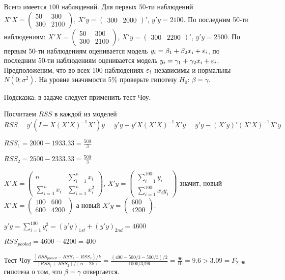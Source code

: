 \begin{problem}
Всего имеется $100$ наблюдений. Для первых 50-ти наблюдений $X'X=\begin{pmatrix}
50 & 300 \\
300 & 2100
\end{pmatrix}$, $X'y=\begin{pmatrix}
300 & 2000
\end{pmatrix}'$, $y'y=2100$. По последним 50-ти наблюдениям: $X'X=\begin{pmatrix}
50 & 300 \\
300 & 2100
\end{pmatrix}$, $X'y=\begin{pmatrix}
300 & 2200
\end{pmatrix}'$, $y'y=2500$. По первым 50-ти наблюдениям оценивается модель $y_i = \beta_1 + \beta_2 x_i + \varepsilon_i$, по последним 50-ти наблюдениям оценивается модель $y_i = \gamma_1 + \gamma_2 x_i + \varepsilon_i$. Предположеним, что во всех 100 наблюдениях $\varepsilon_i$ независимы и нормальны $N(0;\sigma^2)$. На уровне значимости 5\% проверьте гипотезу $H_0: \, \beta=\gamma$.

\begin{sol}

Подсказка: в задаче следует применить тест Чоу.

Посчитаем $RSS$ в каждой из моделей
\[
RSS=y'(I-X(X'X)^{-1}X')y=y'y-y'X(X'X)^{-1}X'y=y'y-(X'y)'(X'X)^{-1}X'y
\]

$RSS_1=2000-1933.33=\frac{500}{3}$

$RSS_2=2500-2333.33=\frac{500}{3}$

$X'X=
\begin{pmatrix}
n&\sum^n_{i=1}x_i\\
\sum^n_{i=1}x_i&\sum^n_{i=1}x_i^2
\end{pmatrix}$, $X'y=
\begin{pmatrix}
\sum^{100}_{i=1}y_i\\
\sum^{100}_{i=1}x_iy_i
\end{pmatrix}$
значит, новый
$X'X=\begin{pmatrix}
100&600\\
600&4200
\end{pmatrix}$
а новый $X'y=
\begin{pmatrix}
600\\
4200
\end{pmatrix}$.

$y'y=\sum^{100}_{i=1}y_i^2=(y'y)_{1st}+(y'y)_{2nd}=4600$

$RSS_{pooled}=4600-4200=400$

Тест Чоу
$\frac{(RSS_{pooled}-RSS_1-RSS_2)/k}{(RSS_1+RSS_2)/(n-2k)}=\frac{(400-500/3-500/3)/2}{1000/3/96}=\frac{96}{10}=9.6>3.09=F_{2,96}$
гипотеза о том, что $\beta=\gamma$ отвергается.
\end{sol}
\end{problem}



